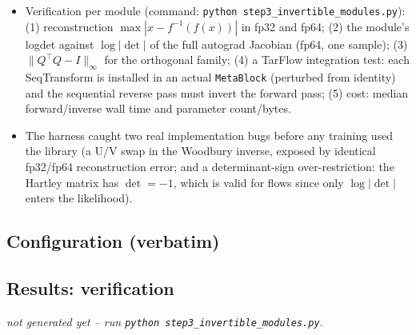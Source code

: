 \documentclass[11pt]{article}
\begin{document}
\begin{itemize}
        ReLU; logit data transform; monotonic rational-quadratic splines
        (arXiv:1906.04032); Woodbury low-rank-plus-diagonal linear maps
        (Lu \& Huang, NeurIPS 2020); affine coupling (RealNVP-style); and
        \textbf{SpectralFloorLinear}, the eigenvalue-floored low-rank map
        proposed for this project: $A = U\,\mathrm{diag}(\lambda)U^\top +
        \lambda_0(I-UU^\top)$ with orthonormal $U\in\mathbb{R}^{D\times k}$
        and $\lambda_i = \lambda_0 + \mathrm{softplus}(\theta_i) \ge
        \lambda_0 > 0$ -- a full-rank invertible stand-in for a rank-$k$
        eigendecomposition in which every unretained eigenvalue is set to the
        floor $\lambda_0$ (necessarily $\le$ each retained one) instead of
        zero; the inverse and $\log\det = \sum_i\log\lambda_i +
        (D-k)\log\lambda_0$ are analytic.
  \item Verification per module (command: \texttt{python
        step3\_invertible\_modules.py}): (1) reconstruction
        $\max|x-f^{-1}(f(x))|$ in fp32 and fp64; (2) the module's logdet
        against $\log|\det|$ of the full autograd Jacobian (fp64, one
        sample); (3) $\|Q^\top Q - I\|_\infty$ for the orthogonal family;
        (4) a TarFlow integration test: each SeqTransform is installed in an
        actual \texttt{MetaBlock} (perturbed from identity) and the
        sequential reverse pass must invert the forward pass; (5) cost:
        median forward/inverse wall time and parameter count/bytes.
  \item The harness caught two real implementation bugs before any training
        used the library (a U/V swap in the Woodbury inverse, exposed by
        identical fp32/fp64 reconstruction error; and a determinant-sign
        over-restriction: the Hartley matrix has $\det=-1$, which is valid
        for flows since only $\log|\det|$ enters the likelihood).
\end{itemize}

\subsection{Configuration (verbatim)}
{\small}

\subsection{Results: verification}
\begin{center}
{\small
{}
  {\emph{not generated yet -- run \texttt{python step3\_invertible\_modules.py}.}}}
\end{center}
\end{document}
